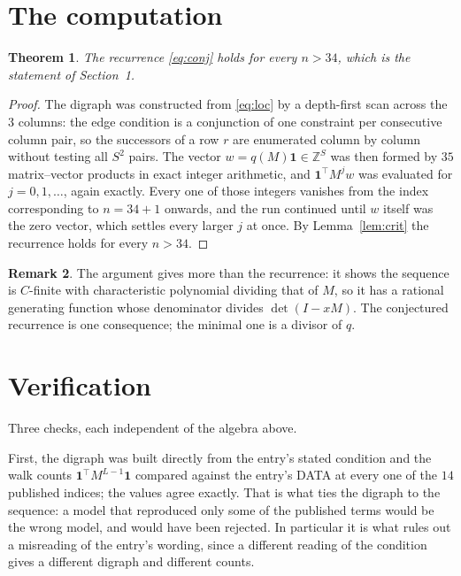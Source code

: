 \documentclass[11pt,a4paper]{article}
\theoremstyle{plain}
\newtheorem{theorem}{Theorem}
\theoremstyle{definition}
\newtheorem{remark}[theorem]{Remark}
\begin{document}
\section{The computation}

\begin{theorem}
The recurrence \eqref{eq:conj} holds for every $n>34$, which is the statement of
Section~1.
\end{theorem}

\begin{proof}
The digraph was constructed from \eqref{eq:loc} by a depth-first scan across the $3$
columns: the edge condition is a conjunction of one constraint per consecutive column
pair, so the successors of a row $r$ are enumerated column by column without testing all
$S^2$ pairs. The vector $w=q(M)\mathbf{1}\in\mathbb{Z}^{S}$ was then formed by $35$
matrix--vector products in exact integer arithmetic, and $\mathbf{1}^{\!\top}M^{j}w$ was
evaluated for $j=0,1,\dots$, again exactly. Every one of those integers vanishes from the
index corresponding to $n=34+1$ onwards, and the run continued until $w$ itself was the
zero vector, which settles every larger $j$ at once. By Lemma~\ref{lem:crit} the recurrence
holds for every $n>34$.
\end{proof}

\begin{remark}
The argument gives more than the recurrence: it shows the sequence is $C$-finite with
characteristic polynomial dividing that of $M$, so it has a rational generating function
whose denominator divides $\det(I-xM)$. The conjectured recurrence is one consequence; the
minimal one is a divisor of $q$.
\end{remark}

\section{Verification}

Three checks, each independent of the algebra above.

First, the digraph was built directly from the entry's stated condition and the walk counts
$\mathbf{1}^{\!\top}M^{L-1}\mathbf{1}$ compared against the entry's DATA at
every one of the $14$ published indices; the values agree exactly. That is what ties
the digraph to the sequence: a model that reproduced only some of the published terms would
be the wrong model, and would have been rejected. In particular it is what rules out a
misreading of the entry's wording, since a different reading of the condition gives a
different digraph and different counts.
\end{document}
